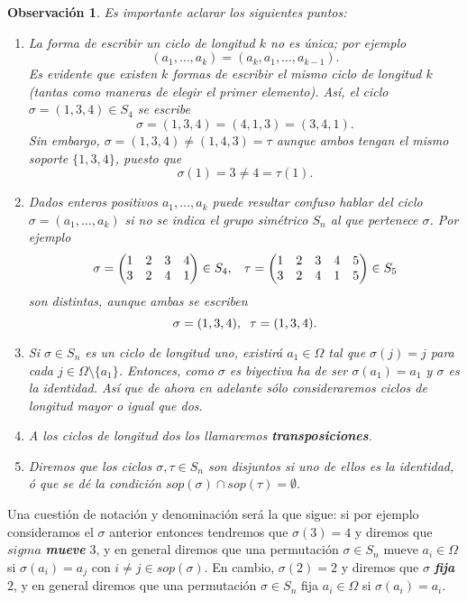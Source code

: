 \documentclass[12pt]{article}
\newtheorem{observation}{Observación}[theorem]
\begin{document}
\begin{observation} Es importante aclarar los siguientes puntos:
\begin{enumerate}
\item La forma de escribir un ciclo de longitud $k$ no es única; por ejemplo $$(a_{1}, \ldots, a_{k}) = (a_{k}, a_{1}, \ldots, a_{k-1}).$$ Es evidente que existen $k$ formas de escribir el mismo ciclo de longitud $k$ (tantas como maneras de elegir el primer elemento). Así, el ciclo $\sigma = (1,3,4) \in S_{4}$ se escribe $$\sigma = (1,3,4) = (4,1,3) = (3,4,1).$$ Sin embargo, $\sigma = (1,3,4) \neq (1,4,3) = \tau$ aunque ambos tengan el mismo soporte $\lbrace 1 ,3, 4\rbrace$, puesto que $$\sigma(1) = 3 \neq 4 = \tau(1).$$
\item Dados enteros positivos $a_{1}, \ldots, a_{k}$ puede resultar confuso hablar del ciclo $\sigma = (a_{1}, \ldots, a_{k})$ si no se indica el grupo simétrico $S_{n}$ al que pertenece $\sigma$. Por ejemplo
$$\sigma=\left(\begin{matrix}
1 &2 &3 &4 \\
3 &2 &4 &1
\end{matrix}
\right) \in S_{4}, \hspace{0.3cm} \tau = \left(\begin{matrix}
1 &2 &3 &4 &5 \\
3 &2 &4 &1 &5
\end{matrix}
\right) \in S_{5}
$$ son distintas, aunque ambas se escriben $$\sigma = (1,3,4), \hspace{0.2cm} \tau = (1,3,4).$$
\item Si $\sigma \in S_{n}$ es un ciclo de longitud uno, existirá $a_{1} \in \Omega$ tal que $\sigma(j) = j$ para cada $j \in \Omega \setminus \lbrace a_{1} \rbrace$. Entonces, como $\sigma$ es biyectiva ha de ser $\sigma(a_{1}) = a_{1}$ y $\sigma$ es la identidad. Así que de ahora en adelante sólo consideraremos ciclos de longitud mayor o igual que dos.
\item A los ciclos de longitud dos los llamaremos \textbf{transposiciones}.
\item Diremos que los ciclos $\sigma, \tau \in S_{n}$ son disjuntos si uno de ellos es la identidad, ó que se dé la condición $sop(\sigma) \cap sop(\tau) = \emptyset.$
\end{enumerate}
\end{observation}

Una cuestión de notación y denominación será la que sigue: si por ejemplo consideramos el $\sigma$ anterior entonces tendremos que $\sigma (3) = 4$ y diremos que $sigma$ \textbf{\textit{mueve}} $3$, y en general diremos que una permutación $\sigma \in S_n$ mueve $a_{i} \in \Omega$ si $\sigma (a_i) = a_j$ con  $i \neq j \in sop(\sigma)$. En cambio, $\sigma(2) = 2$ y diremos que $\sigma$ \textbf{\textit{fija}} $2$, y en general diremos que una permutación $\sigma \in S_n$ fija $a_i \in \Omega$ si $\sigma(a_i) = a_i$.
\end{document}
